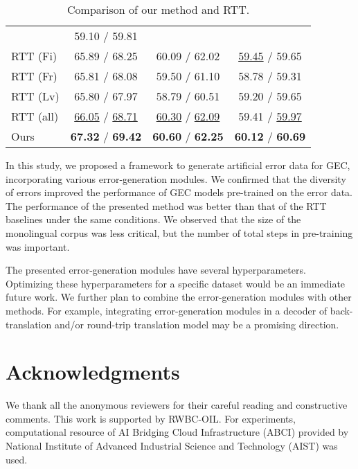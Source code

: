 \documentclass[11pt]{article}
\begin{document}
\begin{table}[t]
\begin{tabular}{lccc}
			& 59.10 / 59.81
			\\
		RTT (Fi)
			& 65.89 / 68.25
			& 60.09 / 62.02
			& \underline{59.45} / 59.65
			\\
		RTT (Fr)
			& 65.81 / 68.08
			& 59.50 / 61.10
			& 58.78 / 59.31
			\\
		RTT (Lv)
			& 65.80 / 67.97
			& 58.79 / 60.51
			& 59.20 / 59.65
			\\
		\hline
		RTT (all)
			& \underline{66.05} / \underline{68.71}
			& \underline{60.30} / \underline{62.09}
			& 59.41 / \underline{59.97}
			\\
		\hline
		Ours 
			& \textbf{67.32} / \textbf{69.42}
			& \textbf{60.60} / \textbf{62.25}
			& \textbf{60.12} / \textbf{60.69}
			\\
		\hline
	\end{tabular}
	\caption{Comparison of our method and RTT.}
	\label{tab:comparison}
\end{table}

In this study, we proposed a framework to generate artificial error data for GEC, incorporating various error-generation modules.
We confirmed that the diversity of errors improved the performance of GEC models pre-trained on the error data.
The performance of the presented method was better than that of the RTT baselines under the same conditions.
We observed that the size of the monolingual corpus was less critical, but the number of total steps in pre-training was important.

The presented error-generation modules have several hyperparameters. Optimizing these hyperparameters for a specific dataset would be an immediate future work.
We further plan to combine the error-generation modules with other methods.
For example, integrating error-generation modules in a decoder of back-translation and/or round-trip translation model may be a promising direction.

\section*{Acknowledgments}

We thank all the anonymous reviewers for their careful reading and constructive comments.
This work is supported by RWBC-OIL.
For experiments, computational resource of AI Bridging Cloud Infrastructure (ABCI) provided by
National Institute of Advanced Industrial Science and Technology (AIST) was used.



\end{document}
